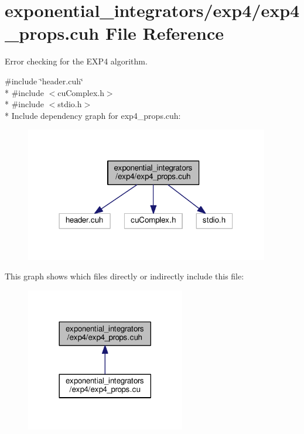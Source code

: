 \hypertarget{exp4__props_8cuh}{}\section{exponential\+\_\+integrators/exp4/exp4\+\_\+props.cuh File Reference}
\label{exp4__props_8cuh}


Error checking for the E\+X\+P4 algorithm.  


{\ttfamily \#include \char`\"{}header.\+cuh\char`\"{}}\\*
{\ttfamily \#include $<$cu\+Complex.\+h$>$}\\*
{\ttfamily \#include $<$stdio.\+h$>$}\\*
Include dependency graph for exp4\+\_\+props.\+cuh\+:\nopagebreak
\begin{figure}[H]
\begin{center}
\leavevmode
\includegraphics[width=302pt]{exp4__props_8cuh__incl}
\end{center}
\end{figure}
This graph shows which files directly or indirectly include this file\+:\nopagebreak
\begin{figure}[H]
\begin{center}
\leavevmode
\includegraphics[width=197pt]{exp4__props_8cuh__dep__incl}
\end{center}
\end{figure}
